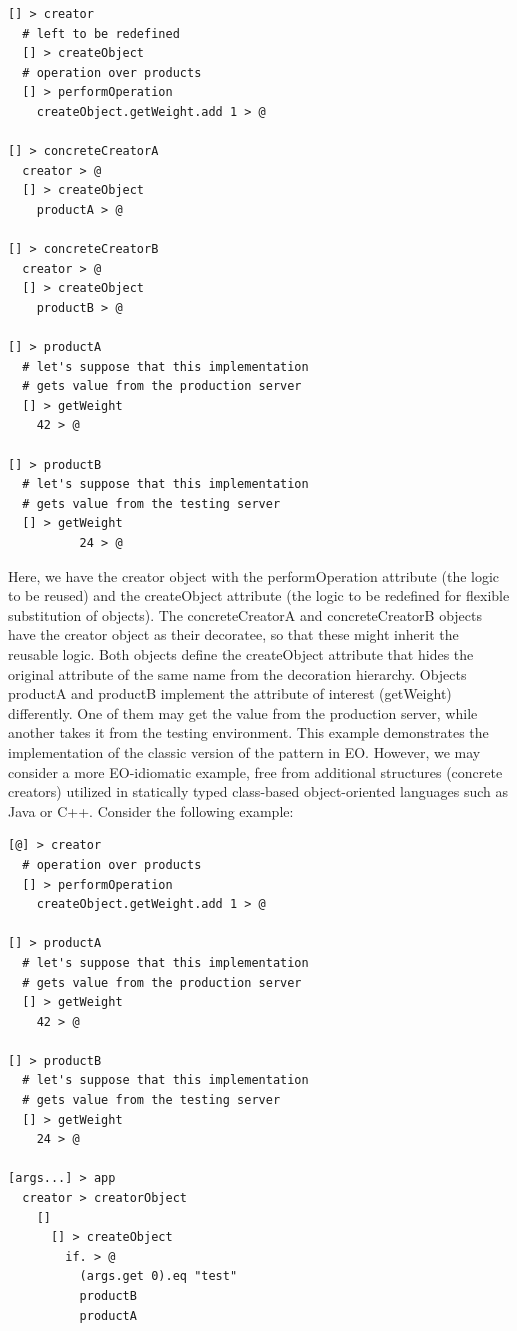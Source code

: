 \documentclass[sigplan,12pt,nonacm=true,review=false]{acmart}
\begin{document}
\begin{verbatim}
[] > creator
  # left to be redefined
  [] > createObject
  # operation over products
  [] > performOperation
    createObject.getWeight.add 1 > @

[] > concreteCreatorA
  creator > @
  [] > createObject
    productA > @

[] > concreteCreatorB
  creator > @
  [] > createObject
    productB > @

[] > productA
  # let's suppose that this implementation
  # gets value from the production server
  [] > getWeight
    42 > @

[] > productB
  # let's suppose that this implementation
  # gets value from the testing server
  [] > getWeight
          24 > @

\end{verbatim}

Here, we have the creator object with the performOperation attribute (the logic to be reused) and the createObject attribute (the logic to be redefined for flexible substitution of objects). The concreteCreatorA and concreteCreatorB objects have the creator object as their decoratee, so that these might inherit the reusable logic. Both objects define the createObject attribute that hides the original attribute of the same name from the decoration hierarchy. Objects productA and productB implement the attribute of interest (getWeight) differently. One of them may get the value from the production server, while another takes it from the testing environment. This example demonstrates the implementation of the classic version of the pattern in EO. However, we may consider a more EO-idiomatic example, free from additional structures (concrete creators) utilized in statically typed class-based object-oriented languages such as Java or C++. Consider the following example: 

\begin{verbatim}
[@] > creator
  # operation over products
  [] > performOperation
    createObject.getWeight.add 1 > @

[] > productA
  # let's suppose that this implementation
  # gets value from the production server
  [] > getWeight
    42 > @

[] > productB
  # let's suppose that this implementation
  # gets value from the testing server
  [] > getWeight
    24 > @

[args...] > app
  creator > creatorObject
    []
      [] > createObject
        if. > @
          (args.get 0).eq "test"
          productB
          productA

\end{verbatim}
\end{document}

